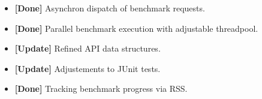 \begin{itemize}
    \item \textbf{[Done]} Asynchron dispatch of benchmark requests.
    \item \textbf{[Done]} Parallel benchmark execution with adjustable threadpool.
    \item \textbf{[Update]} Refined API data structures.
    \item \textbf{[Update]} Adjustements to JUnit tests.
    \item \textbf{[Done]} Tracking benchmark progress via RSS.
\end{itemize}
